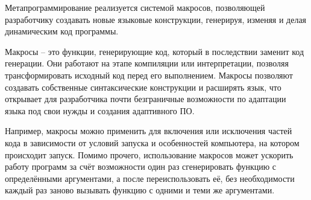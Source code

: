 Метапрограммирование реализуется системой макросов, позволяющей разработчику создавать новые языковые конструкции, генерируя, изменяя и делая динамическим код программы.

Макросы – это функции, генерирующие код, который в последствии заменит код генерации. Они работают на этапе компиляции или интерпретации, позволяя трансформировать исходный код перед его выполнением. Макросы позволяют создавать собственные синтаксические конструкции и расширять язык, что открывает для разработчика почти безграничные возможности по адаптации языка под свои нужды и создания адаптивного ПО. 

Например, макросы можно применить для включения или исключения частей кода в зависимости от условий запуска и особенностей компьютера, на котором происходит запуск. Помимо прочего, использование макросов может ускорить работу программ за счёт возможности один раз сгенерировать функцию с определёнными аргументами, а после переиспользовать её, без необходимости каждый раз заново вызывать функцию с одними и теми же аргументами.
